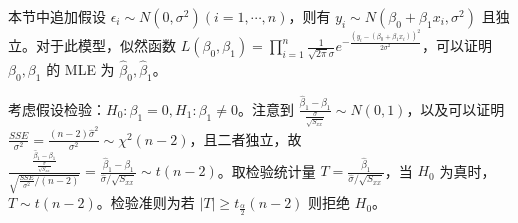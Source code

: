 \documentclass[../main.tex]{subfiles}
\begin{document}
本节中追加假设 $\epsilon_i\sim N(0,\sigma^2)(i=1,\cdots,n)$，则有 $y_i\sim N(\beta_0+\beta_1x_i,\sigma^2)$ 且独立。对于此模型，似然函数 $L(\beta_0,\beta_1)=\prod_{i=1}^n\frac1{\sqrt{2\pi}\sigma}e^{-\frac{(y_i-(\beta_0+\beta_1x_i))^2}{2\sigma^2}}$，可以证明 $\beta_0,\beta_1$ 的 MLE 为 $\hat\beta_0,\hat\beta_1$。

考虑假设检验：$H_0:\beta_1=0,H_1:\beta_1\neq0$。注意到 $\frac{\hat\beta_1-\beta_1}{\frac\sigma{\sqrt{S_{xx}}}}\sim N(0,1)$，以及可以证明 $\frac{SSE}{\sigma^2}=\frac{(n-2)\hat\sigma^2}{\sigma^2}\sim\chi^2(n-2)$，且二者独立，故 $\frac{\frac{\hat\beta_1-\beta_1}{\frac\sigma{\sqrt{S_{xx}}}}}{\sqrt{\frac{SSE}{\sigma^2}/(n-2)}}=\frac{\hat\beta_1-\beta_1}{\hat\sigma/\sqrt{S_{xx}}}\sim t(n-2)$。取检验统计量 $T=\frac{\hat\beta_1}{\hat\sigma/\sqrt{S_{xx}}}$，当 $H_0$ 为真时，$T\sim t(n-2)$。检验准则为若 $|T|\geq t_{\frac\alpha2}(n-2)$ 则拒绝 $H_0$。

\end{document}
